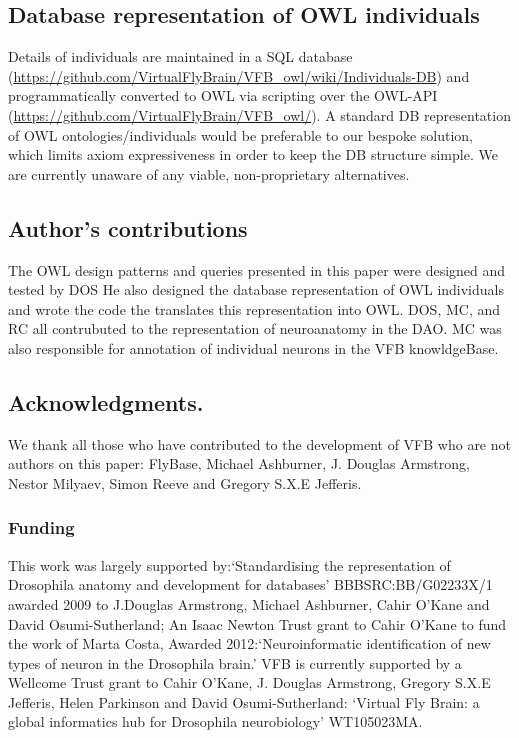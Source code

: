 \documentclass[runningheads,a4paper]{llncs}
\begin{document}
\subsection{Database representation of OWL individuals}

Details of individuals are maintained in a SQL database
(\url{https://github.com/VirtualFlyBrain/VFB_owl/wiki/Individuals-DB})
and programmatically converted to OWL via scripting over the OWL-API
(\url{https://github.com/VirtualFlyBrain/VFB_owl/}).  A standard DB
representation of OWL ontologies/individuals would be preferable to
our bespoke solution, which limits axiom expressiveness in order to
keep the DB structure simple.  We are currently unaware of any viable,
non-proprietary alternatives.

\subsection*{Author's contributions}

The OWL design patterns and queries presented in this paper were designed and
tested by DOS  He also designed the database representation of OWL
individuals and wrote the code the translates this representation into
OWL. DOS, MC, and RC all contrubuted to the representation of
neuroanatomy in the  DAO.  MC  was also responsible for annotation of
individual neurons in the VFB knowldgeBase.

\subsection*{Acknowledgments.}

We thank all those who have contributed to the development of VFB who
are not authors on this paper: FlyBase, Michael Ashburner, J. Douglas
Armstrong, Nestor Milyaev, Simon Reeve and Gregory S.X.E Jefferis.

\subsubsection*{Funding}

This work was largely supported by:`Standardising the representation of
Drosophila anatomy and development for databases' 
BBBSRC:BB/G02233X/1 awarded 2009 to J.Douglas Armstrong, Michael 
Ashburner, Cahir O'Kane and David Osumi-Sutherland;  An Isaac Newton
Trust grant to Cahir O'Kane to fund the work of Marta Costa, Awarded
2012:`Neuroinformatic identification of new types of neuron in the
Drosophila brain.' VFB is currently supported by a Wellcome Trust
grant to Cahir O'Kane, J. Douglas Armstrong, Gregory S.X.E Jefferis,
Helen Parkinson and David Osumi-Sutherland: `Virtual Fly Brain: a
global informatics hub for Drosophila neurobiology' WT105023MA.





\end{document}
